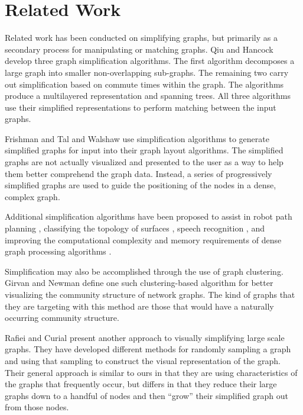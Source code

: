 \section{Related Work}
Related work has been conducted on simplifying graphs, but primarily as a secondary process for manipulating or  matching graphs.  Qiu and Hancock \cite{Qiu-Hancock04,Qiu-Hancock07} develop three graph simplification algorithms.  The first algorithm decomposes a large graph into smaller non-overlapping sub-graphs.  The remaining two carry out simplification based on commute times within the graph.  The algorithms produce a multilayered representation and spanning trees. All three algorithms use their simplified representations to perform matching between the input graphs.

Frishman and Tal \cite{Frishman-Tal07} and Walshaw \cite{Walshaw03} use simplification algorithms to generate simplified graphs for input into their graph layout algorithms.  The simplified graphs are not actually visualized and presented to the user as a way to help them better comprehend the graph data.  Instead, a series of progressively simplified graphs are used to guide the positioning of the nodes in a dense, complex graph.

Additional simplification algorithms have been proposed to assist in robot path planning \cite{Rizzi98}, classifying the topology of surfaces \cite{Ban-Sen03}, speech recognition \cite{LiuHarJohJam03}, and improving the computational complexity and memory requirements of dense graph processing algorithms \cite{KaoOccTen98,suel01compressing,Feder-Motwani95}.

Simplification may also be accomplished through the use of graph clustering.  Girvan and Newman \cite{Girvan-Newman02} define one such clustering-based algorithm for better visualizing the community structure of network graphs.  The kind of graphs that they are targeting with this method are those that would have a naturally occurring community structure.

Rafiei and Curial \cite{Rafiei-Curial05} present another approach to visually simplifying large scale graphs.  They have developed different methods for randomly sampling a graph and using that sampling to construct the visual representation of the graph.  Their general approach is similar to ours in that they are using characteristics of the graphs that frequently occur, but differs in that they reduce their large graphs down to a handful of nodes and then ``grow'' their simplified graph out from those nodes.

